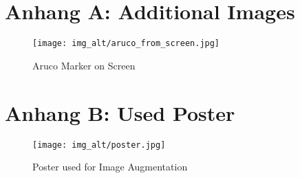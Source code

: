 \documentclass[a4paper,twocolumn]{article}
\begin{document}

\appendix
\section*{Anhang A: Additional Images}

\begin{figure}[h!]
    \centering
    \texttt{[image: img\_alt/aruco\_from\_screen.jpg]}
    \caption{Aruco Marker on Screen \cite{tim-schweitzer}}
    \label{fig:example-appendix}
\end{figure}

\section*{Anhang B: Used Poster}

\begin{figure}[h!]
    \centering
    \texttt{[image: img\_alt/poster.jpg]}
    \caption{Poster used for Image Augmentation\cite{v_speed}}
    \label{fig:img-poster}
\end{figure}
\end{document}
